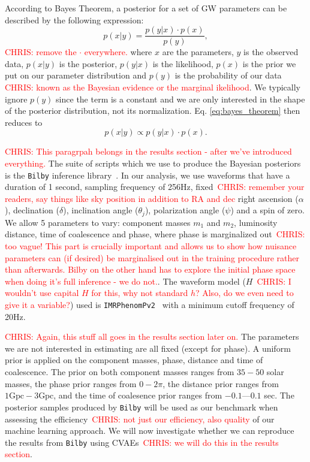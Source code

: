 \documentclass[%
showpacs,
 amsmath,amssymb,
 aps,
 twocolumn,
 prl,
 reprint,
floatfix,
]{revtex4-1}
\newcommand{\chris}[1]{\textcolor{red}{CHRIS: #1}}
\begin{document}
%
%
According to Bayes Theorem, a posterior for a set of GW parameters can be described by the
following expression:
%
\begin{equation}
    p(x|y) = \frac{p(y|x) \cdot p(x)}{p(y)},\label{eq:bayes_theorem}
\end{equation}
%
\chris{remove the $\cdot$ everywhere.} where $x$ are the parameters, $y$ is the
observed data, $p(x|y)$ is the posterior, $p(y|x)$ is the likelihood, $p(x)$ is
the prior we put on our parameter distribution and $p(y)$ is the probability of
our data \chris{known as the Bayesian evidence or the marginal ikelihood}. We
typically ignore $p(y)$ since the term is a constant and we are only interested
in the shape of the posterior distribution, not its normalization. Eq.
\ref{eq:bayes_theorem} then reduces to
%
\begin{equation}\label{eq:simplified_bayes} 
p(x|y) \propto p(y|x) \cdot p(x).
\end{equation}

%
%
\chris{This paragrpah belongs in the results section - after we've introduced
everything.} The suite of scripts which we use to produce the Bayesian
posteriors is the \texttt{Bilby} inference library~\cite{1811.02042}. In our
analysis, we use waveforms that have a duration of 1 second, sampling frequency
of 256Hz, fixed~\chris{remember your readers, say things like sky position in
addition to RA and dec} right ascension ($\alpha$), declination ($\delta$),
inclination angle ($\theta_j$), polarization angle ($\psi$) and a spin of zero.
We allow 5 parameters to vary: component masses $m_1$ and $m_2$, luminosity
distance, time of coalescence and phase, where phase is marginalized
out~\chris{too vague!  This part is crucially important and allows us to show
how nuisance parameters can (if desired) be marginalised out in the training
procedure rather than afterwards. Bilby on the other hand has to explore the
initial phase space when doing it's full inference - we do not.}. The waveform
model ($H$~\chris{I wouldn't use capital $H$ for this, why not standard $h$?
Also, do we even need to give it a variable?}) used is
\texttt{IMRPhenomPv2}~\cite{1809.10113} with a minimum cutoff frequency of
20Hz.

%
%
\chris{Again, this stuff all goes in the results section later on.} The
parameters we are not interested in estimating are all fixed (except for
phase). A uniform prior is applied on the component masses, phase, distance and
time of coalescence. The prior on both component masses ranges from $35 - 50$
solar masses, the phase prior ranges from $0 - 2\pi$, the distance prior ranges
from $1\textrm{Gpc} - 3\textrm{Gpc}$, and the time of coalesence prior ranges
from $-0.1$---$0.1$ sec. The posterior samples produced by \texttt{Bilby} will
be used as our benchmark when assessing the efficiency~\chris{not just our
efficiency, also quality} of our machine learning approach. We will now
investigate whether we can reproduce the results from \texttt{Bilby} using
\ac{CVAE}s~\chris{we will do this in the results section}. 
   
\end{document}
